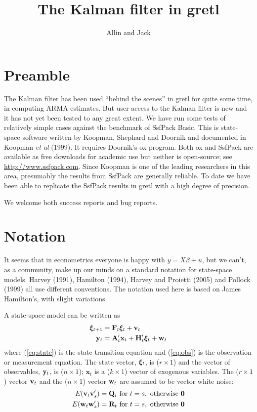 \documentclass[a4paper]{article}
\title{The Kalman filter in gretl}
\author{Allin and Jack}
\newcommand{\obsvec}{\ensuremath\mathbf{y}}
\newcommand{\obsmat}{\ensuremath\mathbf{H}}
\newcommand{\obsx}{\ensuremath\mathbf{x}}
\newcommand{\obsxmat}{\ensuremath\mathbf{A}}
\newcommand{\obsdist}{\ensuremath\mathbf{w}}
\newcommand{\obsvar}{\ensuremath\mathbf{R}}
\newcommand{\statevec}{\ensuremath\mathbf{\bm \xi}}
\newcommand{\statemat}{\ensuremath\mathbf{F}}
\newcommand{\strdist}{\ensuremath\mathbf{v}}
\newcommand{\strvar}{\ensuremath\mathbf{Q}}
\begin{document}
\maketitle

\section{Preamble}
\label{sec:amble}

The Kalman filter has been used ``behind the scenes'' in gretl for
quite some time, in computing ARMA estimates.  But user access to the
Kalman filter is new and it has not yet been tested to any great
extent.  We have run some tests of relatively simple cases against the
benchmark of \textsf{SsfPack Basic}.  This is state-space software
written by Koopman, Shephard and Doornik and documented in Koopman
\textit{et al} (1999).  It requires Doornik's \textsf{ox} program.
Both \textsf{ox} and \textsf{SsfPack} are available as free downloads
for academic use but neither is open-source; see
\url{http://www.ssfpack.com}.  Since Koopman is one of the leading
researchers in this area, presumably the results from \textsf{SsfPack}
are generally reliable.  To date we have been able to replicate the
\textsf{SsfPack} results in gretl with a high degree of precision.

We welcome both success reports and bug reports.

\section{Notation}

It seems that in econometrics everyone is happy with $y = X \beta +
u$, but we can't, as a community, make up our minds on a standard
notation for state-space models. Harvey (1991), Hamilton (1994),
Harvey and Proietti (2005) and Pollock (1999) all use different
conventions. The notation used here is based on James Hamilton's, with
slight variations.

A state-space model can be written as
%
\begin{align}
  \label{eq:state}
  \statevec_{t+1} &=  \statemat_t \statevec_t + \strdist_t \\
  \label{eq:obs}
  \obsvec_t &= \obsxmat_t'\obsx_t + \obsmat_t' \statevec_t +
  \obsdist_t 
\end{align}
%
where (\ref{eq:state}) is the state transition equation and
(\ref{eq:obs}) is the observation or measurement equation.  The state
vector, $\statevec_{t}$, is ($r \times 1$) and the vector of
observables, $\obsvec_t$, is ($n \times 1$); $\mathbf{x}_t$ is a ($k
\times 1$) vector of exogenous variables.  The ($r \times 1$) vector
$\strdist_t$ and the ($n \times 1$) vector $\obsdist_t$ are assumed to
be vector white noise:
%
\begin{align*}
E(\strdist_t \strdist_s') &= \strvar_t \mbox{ for } t = s, 
    \mbox{ otherwise } \mathbf{0} \\
E(\obsdist_t \obsdist_s') &= \obsvar_t \mbox{ for } t = s, 
    \mbox{ otherwise } \mathbf{0}
\end{align*}
\end{document}
